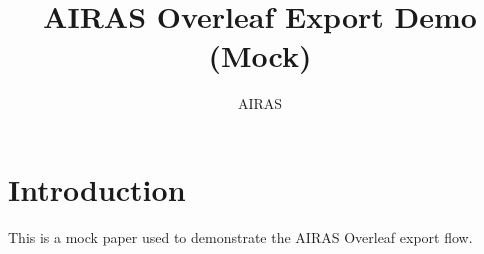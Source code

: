 \documentclass{article}
\title{AIRAS Overleaf Export Demo (Mock)}
\author{AIRAS}
\begin{document}
\maketitle
\section{Introduction}
This is a mock paper used to demonstrate the AIRAS Overleaf export flow.
\end{document}

